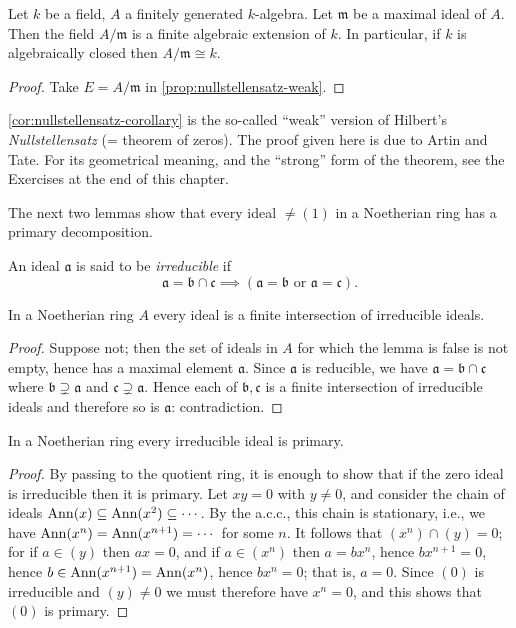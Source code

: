 \begin{corollary}\label{cor:nullstellensatz-corollary}
Let $k$ be a field, $A$ a finitely generated $k$-algebra. Let $\mathfrak{m}$ be a maximal ideal of $A$. Then the field $A/\mathfrak{m}$ is a finite algebraic extension of $k$. In particular, if $k$ is algebraically closed then $A/\mathfrak{m} \cong k$.
\end{corollary}

\begin{proof}
Take $E = A/\mathfrak{m}$ in \eqref{prop:nullstellensatz-weak}.
\end{proof}

\eqref{cor:nullstellensatz-corollary} is the so-called ``weak'' version of Hilbert's \emph{Nullstellensatz} (= theorem of zeros). The proof given here is due to Artin and Tate. For its geometrical meaning, and the ``strong'' form of the theorem, see the Exercises at the end of this chapter.


The next two lemmas show that every ideal $\neq (1)$ in a Noetherian ring has a primary decomposition.

An ideal $\mathfrak{a}$ is said to be \emph{irreducible} if
\[
\mathfrak{a} = \mathfrak{b} \cap \mathfrak{c} \implies (\mathfrak{a} = \mathfrak{b} \text{ or } \mathfrak{a} = \mathfrak{c}).
\]

\begin{lemma}\label{lem:finite-intersection-irreducible}
In a Noetherian ring $A$ every ideal is a finite intersection of irreducible ideals.
\end{lemma}

\begin{proof}
Suppose not; then the set of ideals in $A$ for which the lemma is false is not empty, hence has a maximal element $\mathfrak{a}$. Since $\mathfrak{a}$ is reducible, we have $\mathfrak{a} = \mathfrak{b} \cap \mathfrak{c}$ where $\mathfrak{b} \supsetneq \mathfrak{a}$ and $\mathfrak{c} \supsetneq \mathfrak{a}$. Hence each of $\mathfrak{b}, \mathfrak{c}$ is a finite intersection of irreducible ideals and therefore so is $\mathfrak{a}$: contradiction.
\end{proof}

\begin{lemma}\label{lem:irreducible-primary}
In a Noetherian ring every irreducible ideal is primary.
\end{lemma}

\begin{proof}
By passing to the quotient ring, it is enough to show that if the zero ideal is irreducible then it is primary. Let $xy = 0$ with $y \neq 0$, and consider the chain of ideals $\operatorname{Ann}(x) \subseteq \operatorname{Ann}(x^2) \subseteq \cdots$. By the a.c.c., this chain is stationary, i.e., we have $\operatorname{Ann}(x^n) = \operatorname{Ann}(x^{n+1}) = \cdots$ for some $n$. It follows that $(x^n) \cap (y) = 0$; for if $a \in (y)$ then $ax = 0$, and if $a \in (x^n)$ then $a = bx^n$, hence $bx^{n+1} = 0$, hence $b \in \operatorname{Ann}(x^{n+1}) = \operatorname{Ann}(x^n)$, hence $bx^n = 0$; that is, $a = 0$. Since $(0)$ is irreducible and $(y) \neq 0$ we must therefore have $x^n = 0$, and this shows that $(0)$ is primary.
\end{proof}

